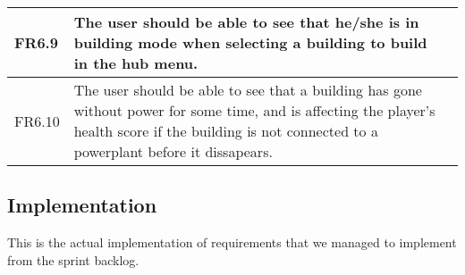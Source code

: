 \begin{tabular}{| p{1cm} | p{8cm} | p{3cm} |}
		FR6.9 & The user should be able to see that he/she is in building mode when selecting 
		a building to build in the hub menu. & \\ \hline

		FR6.10 & The user should be able to see that a building has gone without power for 
		some time, and is affecting the player's health score if the building is not connected 
		to a powerplant before it dissapears. & \\ \hline

	\end{tabular}

\subsection{Implementation}
	
	This is the actual implementation of requirements that we managed to implement
	from the sprint backlog.
	
